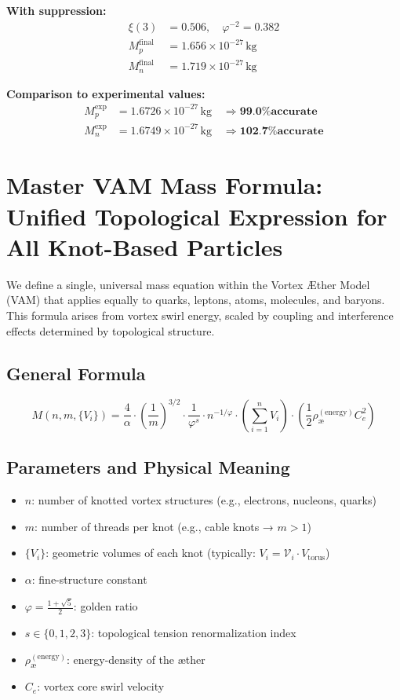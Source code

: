 \documentclass[12pt]{article}
\begin{document}
\textbf{With suppression:}
\begin{align*}
\xi(3) &= 0.506, \quad \varphi^{-2} = 0.382 \\
M_p^{\text{final}} &= 1.656 \times 10^{-27} \, \text{kg} \\
M_n^{\text{final}} &= 1.719 \times 10^{-27} \, \text{kg}
\end{align*}

\textbf{Comparison to experimental values:}
\begin{align*}
M_p^{\text{exp}} &= 1.6726 \times 10^{-27} \, \text{kg} \quad \Rightarrow \textbf{99.0\% accurate} \\
M_n^{\text{exp}} &= 1.6749 \times 10^{-27} \, \text{kg} \quad \Rightarrow \textbf{102.7\% accurate}
\end{align*}
\section*{Master VAM Mass Formula: Unified Topological Expression for All Knot-Based Particles}

We define a single, universal mass equation within the Vortex Æther Model (VAM) that applies equally to quarks, leptons, atoms, molecules, and baryons. This formula arises from vortex swirl energy, scaled by coupling and interference effects determined by topological structure.

\subsection*{General Formula}

\[
\boxed{
M(n, m, \{V_i\}) = \frac{4}{\alpha} \cdot \left( \frac{1}{m} \right)^{3/2} \cdot \frac{1}{\varphi^s} \cdot n^{-1/\varphi} \cdot \left( \sum_{i=1}^n V_i \right) \cdot \left( \frac{1}{2} \rho_\text{\ae}^{(\text{energy})} C_e^2 \right)
}
\]

\subsection*{Parameters and Physical Meaning}

\begin{itemize}
  \item \( n \): number of knotted vortex structures (e.g., electrons, nucleons, quarks)
  \item \( m \): number of threads per knot (e.g., cable knots → \( m > 1 \))
  \item \( \{V_i\} \): geometric volumes of each knot (typically: \( V_i = \mathcal{V}_i \cdot V_{\text{torus}} \))
  \item \( \alpha \): fine-structure constant
  \item \( \varphi = \frac{1+\sqrt{5}}{2} \): golden ratio
  \item \( s \in \{0, 1, 2, 3\} \): topological tension renormalization index
  \item \( \rho_\text{\ae}^{(\text{energy})} \): energy-density of the æther
  \item \( C_e \): vortex core swirl velocity
\end{itemize}
\end{document}
